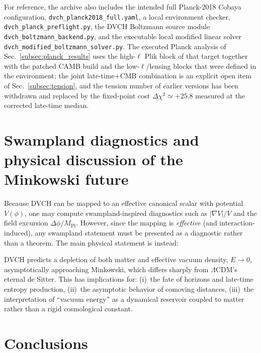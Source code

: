 \documentclass[pdflatex,sn-mathphys-num]{sn-jnl}%
\newcommand{\mpl}{M_{\mathrm{Pl}}}
\begin{document}
For reference, the archive also includes the intended full Planck-2018
Cobaya configuration, \texttt{dvch\_planck2018\_full.yaml}, a local
environment checker, \texttt{dvch\_planck\_preflight.py}, the DVCH
Boltzmann source module \texttt{dvch\_boltzmann\_backend.py}, and the
executable local modified linear solver
\texttt{dvch\_modified\_boltzmann\_solver.py}. The executed Planck analysis
of Sec.~\ref{subsec:planck_results} uses the high-$\ell$ Plik block of that
target together with the patched CAMB build and the low-$\ell$/lensing
blocks that were defined in the environment; the joint late-time$+$CMB
combination is an explicit open item of Sec.~\ref{subsec:tension}, and the
tension number of earlier versions has been withdrawn and replaced by the
fixed-point cost $\Delta\chi^2\simeq+25.8$ measured at the corrected
late-time median.

\section{Swampland diagnostics and physical discussion of the Minkowski future}
\label{sec:swampland}

Because DVCH can be mapped to an effective canonical scalar with potential
$V(\phi)$, one may compute swampland-inspired diagnostics such as
$|\nabla V|/V$ and the field excursion $\Delta\phi/\mpl$. However, since the
mapping is \emph{effective} (and interaction-induced), any swampland statement
must be presented as a diagnostic rather than a theorem. The main physical statement is instead:

DVCH predicts a depletion of both matter and effective vacuum density,
$E\to 0$, asymptotically approaching Minkowski, which differs sharply from
$\Lambda$CDM's eternal de Sitter. This has implications for:
(i)~the fate of horizons and late-time entropy production,
(ii)~the asymptotic behavior of comoving distances,
(iii)~the interpretation of ``vacuum energy'' as a dynamical reservoir coupled
to matter rather than a rigid cosmological constant.

\section{Conclusions}
\label{sec:conclusions}
\end{document}
